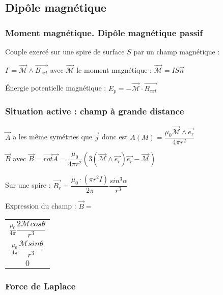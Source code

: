 \documentclass[9pt]{article}
\begin{document}
\begin{multicols*}{2}
\setlength{\columnseprule}{0.1pt}
\part*{Dipôle magnétique}
\section{Moment magnétique. Dipôle magnétique passif}
 Couple exercé sur une spire de surface $S$ par un champ magnétique :
 
 $\boxed{ \Gamma= \overrightarrow{\mathcal{M}}\wedge\overrightarrow{B_{ext}}}$ avec $\overrightarrow{\mathcal{M}}$ le moment magnétique  : $\boxed{\overrightarrow{\mathcal{M}} = IS\overrightarrow{n}}$
 
 Énergie potentielle magnétique : $E_{p}=-\overrightarrow{\mathcal{M}}\cdot\overrightarrow{B_{ext}}$
 
 \section{Situation active : champ à grande distance}
$\overrightarrow{A}$ a les même symétries que $\overrightarrow{j}$ donc est
 $\boxed{\overrightarrow{A(M)}=\dfrac{\mu_{0}\overrightarrow{\mathcal{M}}\wedge\overrightarrow{e_{r}}}{4 \pi r^{2}}}$
 
$\overrightarrow{B}$ avec $\overrightarrow{B}=\overrightarrow{rot}\overrightarrow{A}=\dfrac{\mu_{0}}{4\pi r^{2}}(3(\overrightarrow{\mathcal{M}}\wedge\overrightarrow{e_{r}})\overrightarrow{e_{r}}-\overrightarrow{\mathcal{M}})$

Sur une spire : $\overrightarrow{B_r}=\dfrac{\mu_{0}\cdot(\pi r^{2}I)}{2\pi}\dfrac{sin^{3}\alpha}{r^{3}}$

Expression du champ : 
$\overrightarrow{B}=$
\begin{tabular}{|c}
$\frac{\mu _0}{4\pi }\dfrac{2 \mathcal{M} cos\theta}{r^3}$ \\ 

$\frac{\mu _0}{4\pi }\dfrac{ \mathcal{M} sin\theta}{r^3}$ \\ 

$0$ \\ 
\end{tabular} 

\section{Force de Laplace}


\end{multicols*}
\end{document}
